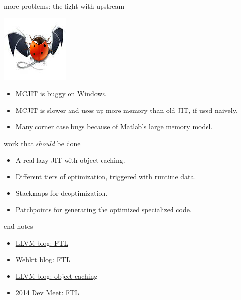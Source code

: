 \documentclass{beamer}
\begin{document}
\begin{frame}{more problems: the fight with upstream}
  \begin{center}\includegraphics[scale=0.3]{llvm-bug}\end{center}
  \begin{itemize}
  \item MCJIT is buggy on Windows.
  \item MCJIT is slower and uses up more memory than old JIT, if used
    naively.
  \item Many corner case bugs because of Matlab's large memory model.
  \end{itemize}
\end{frame}

\begin{frame}{work that \textit{should} be done}
  \begin{itemize}
  \item A real lazy JIT with object caching.
  \item Different tiers of optimization, triggered with runtime data.
  \item Stackmaps for deoptimization.
  \item Patchpoints for generating the optimized specialized code.
  \end{itemize}
\end{frame}

\begin{frame}{end notes}
  \begin{itemize}
  \item \href{http://blog.llvm.org/2014/07/ftl-webkits-llvm-based-jit.html}{LLVM
      blog: FTL}
  \item
    \href{https://www.webkit.org/blog/3362/introducing-the-webkit-ftl-jit/}{Webkit
      blog: FTL}
  \item
    \href{http://blog.llvm.org/2013/08/object-caching-with-kaleidoscope.html}{LLVM
      blog: object caching}
  \item \href{http://llvm.org/devmtg/2014-10/Slides/Trick-FTL.pdf}{2014 Dev Meet:
      FTL}
  \end{itemize}
\end{frame}
\end{document}
